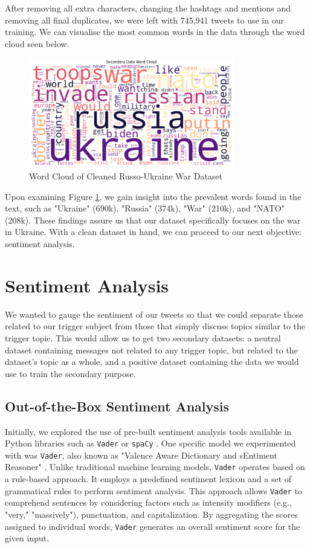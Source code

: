 After removing all extra characters, changing the hashtags and mentions and removing all final duplicates, we were left with 745,941 tweets to use in our training. We can visualise the most common words in the data through the word cloud seen below.

\begin{figure}[H]
    \centering
    \includegraphics[width=0.8\textwidth]{graphs/word_cloud.png}
    \caption{Word Cloud of Cleaned Russo-Ukraine War Dataset}
    \label{fig:label}
\end{figure}

Upon examining Figure \ref{fig:label}, we gain insight into the prevalent words found in the text, such as "Ukraine" (690k), "Russia" (374k), "War" (210k), and "NATO" (208k). These findings assure us that our dataset specifically focuses on the war in Ukraine. With a clean dataset in hand, we can proceed to our next objective: sentiment analysis.

\section{Sentiment Analysis}

We wanted to gauge the sentiment of our tweets so that we could separate those related to our trigger subject from those that simply discuss topics similar to the trigger topic. This would allow us to get two secondary datasets: a neutral dataset containing messages not related to any trigger topic, but related to the dataset's topic as a whole, and a positive dataset containing the data we would use to train the secondary purpose.

\subsection{Out-of-the-Box Sentiment Analysis}

Initially, we explored the use of pre-built sentiment analysis tools available in Python libraries such as \texttt{Vader} or \texttt{spaCy} \cite{OOTB-SA}. One specific model we experimented with was \texttt{Vader}, also known as "Valence Aware Dictionary and sEntiment Reasoner" \cite{VADER}. Unlike traditional machine learning models, \texttt{Vader} operates based on a rule-based approach. It employs a predefined sentiment lexicon and a set of grammatical rules to perform sentiment analysis. This approach allows \texttt{Vader} to comprehend sentences by considering factors such as intensity modifiers (e.g., "very," "massively"), punctuation, and capitalization. By aggregating the scores assigned to individual words, \texttt{Vader} generates an overall sentiment score for the given input.

